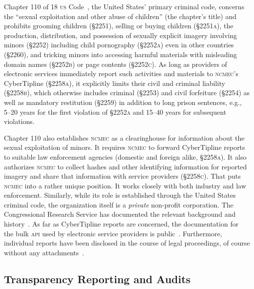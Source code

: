 \documentclass[nonacm,screen]{acmart}
\newcommand\V[1]{\textsc{\MakeLowercase{#1}}}
\begin{document}
Chapter 110 of 18 \V{US} Code~\cite{Chapter110Code18US}, the United States'
primary criminal code, concerns the ``sexual exploitation and other abuse of
children'' (the chapter's title) and prohibits grooming children (\S2251),
selling or buying children (\V{\S2251A}), the production, distribution, and
possession of sexually explicit imagery involving minors (\S2252) including
child pornography (\V{\S2252A}) even in other countries (\S2260), and tricking
minors into accessing harmful materials with misleading domain names
(\V{\S2252B}) or page contents (\V{\S2252C}). As long as providers of electronic
services immediately report such activities and materials to \V{NCMEC}'s
CyberTipline (\V{\S2258A}), it explicitly limits their civil and criminal
liability (\V{\S2258B}), which otherwise includes criminal (\S2253) and civil
forfeiture (\S2254) as well as mandatory restitution (\S2259) in addition to
long prison sentences, e.g., 5--20 years for the first violation of \V{\S2252A}
and 15--40 years for subsequent violations.

Chapter 110 also establishes \V{NCMEC} as a clearinghouse for information about
the sexual exploitation of minors. It requires \V{NCMEC} to forward CyberTipline
reports to suitable law enforcement agencies (domestic and foreign alike,
\V{\S2258A}). It also authorizes \V{NCMEC} to collect hashes and other
identifying information for reported imagery and share that information with
service providers (\V{\S2258C}). That puts \V{NCMEC} into a rather unique
position. It works closely with both industry and law enforcement. Similarly,
while its role is established through the United States criminal code, the
organization itself is a \emph{private} non-profit corporation. The
Congressional Research Service has documented the relevant background and
history~\cite{FernandesAlcantaraHanson2021}. As far as CyberTipline reports are
concerned, the documentation for the bulk \V{API} used by electronic service
providers is public~\cite{NCMEC2024}. Furthermore, individual reports have been
disclosed in the course of legal proceedings, of course without any
attachments~\cite{NationalCenterForMissingAndExploitedChildren2017,
NationalCenterForMissingAndExploitedChildren2017a}.


\subsection{Transparency Reporting and Audits}
\end{document}
